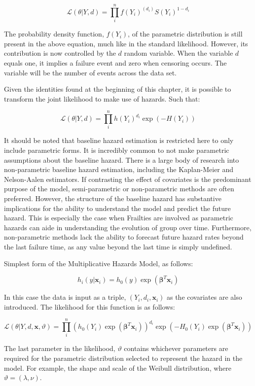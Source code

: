$$ \mathcal {L}(\theta|Y, d) = \prod^n_i f(Y_i)^{(d_i)} S(Y_i)^{1 - d_i} $$

The probability density function, $f(Y_i)$, of the parametric distribution is still present in the above equation, much like in the standard likelihood. However, its contribution is now controlled by the $d$ random variable. When the variable $d$ equals one, it implies a failure event and zero when censoring occurs. The variable will be the number of events across the data set.

Given the identities found at the beginning of this chapter, it is possible to transform the joint likelihood to make use of hazards. Such that:

$$ \mathcal {L}(\theta|Y, d) = \prod^n_i h(Y_i)^{d_i} \exp(-H(Y_i)) $$

It should be noted that baseline hazard estimation is restricted here to only include parametric forms. It is incredibly common to not make parametric assumptions about the baseline hazard. There is a large body of research into non-parametric baseline hazard estimation, including the Kaplan-Meier and Nelson-Aalen estimators. If contrasting the effect of covariates is the predominant purpose of the model, semi-parametric or non-parametric methods are often preferred\cite{NEEDED}. However, the structure of the baseline hazard has substantive implications for the ability to understand the model and predict the future hazard. This is especially the case when Frailties are involved as parametric hazards can aide in understanding the evolution of group over time. Furthermore, non-parametric methods lack the ability to forecast future hazard rates beyond the last failure time, as any value beyond the last time is simply undefined.

Simplest form of the Multiplicative Hazards Model, as follows:

$$ h_i(y|\textbf{x}_i) = h_0(y) \exp(\boldsymbol\beta^T \textbf{x}_i) $$

In this case the data is input as a triple, $(Y_i, d_i, \textbf{x}_i)$ as the covariates are also introduced. The likelihood for this function is as follows:

$$ \mathcal {L}(\theta|Y, d, \textbf{x}, \vartheta) = \prod^n_i \left (h_0(Y_i) \exp(\boldsymbol\beta^T \textbf{x}_i)  \right )^{d_i} \exp(-H_0(Y_i) \exp(\boldsymbol\beta^T \textbf{x}_i)) $$

The last parameter in the likelihood, $\vartheta$ contains whichever parameters are required for the parametric distribution selected to represent the hazard in the model. For example, the shape and scale of the Weibull distribution, where $\vartheta = (\lambda, \nu)$.

